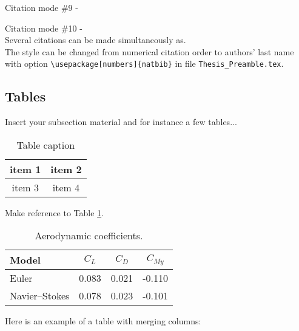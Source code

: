 Citation mode \#9 - \quad \citeyear{jameson:adjointns}

Citation mode \#10 - \quad \citeyearpar{jameson:adjointns} \\


Several citations can be made simultaneously as\quad \cite{nocedal:opt,marta:ijcfd}. \\

The style can be changed from numerical citation order to authors' last name with option {\tt \textbackslash usepackage[numbers]\{natbib\}} in file {\tt Thesis\_Preamble.tex}.


\subsection{Tables}
\label{subsection:tables}

Insert your subsection material and for instance a few tables...

\begin{table}[h!]
  \begin{center}
    \begin{tabular}{|c|c|}
      \hline
      item 1 & item 2 \\
      \hline
      item 3 & item 4 \\
      \hline
    \end{tabular}
  \end{center}
  \caption[Table caption shown in TOC]{Table caption}
  \label{table:simple}
\end{table}

Make reference to Table \ref{table:simple}.

\begin{table}[!htb]
  \begin{center}
    \begin{tabular}{lccc}
      Model           & $C_L$ & $C_D$ & $C_{M y}$ \\
      \hline
      Euler           & 0.083 & 0.021 & -0.110    \\
      Navier--Stokes  & 0.078 & 0.023 & -0.101    \\
      \hline
    \end{tabular}
  \end{center}
  \caption{Aerodynamic coefficients.}
  \label{tab:aeroCoeff}
\end{table}

Here is an example of a table with merging columns:

